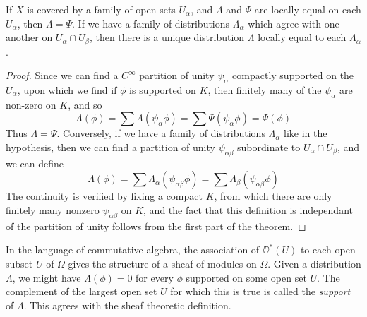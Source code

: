 \begin{theorem}
    If $X$ is covered by a family of open sets $U_\alpha$, and $\Lambda$ and $\Psi$ are locally equal on each $U_\alpha$, then $\Lambda = \Psi$. If we have a family of distributions $\Lambda_\alpha$ which agree with one another on $U_\alpha \cap U_\beta$, then there is a unique distribution $\Lambda$ locally equal to each $\Lambda_\alpha$.
\end{theorem}
\begin{proof}
    Since we can find a $C^\infty$ partition of unity $\psi_\alpha$ compactly supported on the $U_\alpha$, upon which we find if $\phi$ is supported on $K$, then finitely many of the $\psi_\alpha$ are non-zero on $K$, and so
    \[ \Lambda(\phi) = \sum \Lambda(\psi_\alpha \phi) = \sum \Psi(\psi_\alpha \phi) = \Psi(\phi) \]
    Thus $\Lambda = \Psi$. Conversely, if we have a family of distributions $\Lambda_\alpha$ like in the hypothesis, then we can find a partition of unity $\psi_{\alpha \beta}$ subordinate to $U_\alpha \cap U_\beta$, and we can define
    \[ \Lambda(\phi) = \sum \Lambda_\alpha(\psi_{\alpha \beta} \phi) = \sum \Lambda_\beta(\psi_{\alpha \beta} \phi) \]
    The continuity is verified by fixing a compact $K$, from which there are only finitely many nonzero $\psi_{\alpha \beta}$ on $K$, and the fact that this definition is independant of the partition of unity follows from the first part of the theorem.
\end{proof}

In the language of commutative algebra, the association of $\DD^*(U)$ to each open subset $U$ of $\Omega$ gives the structure of a sheaf of modules on $\Omega$. Given a distribution $\Lambda$, we might have $\Lambda(\phi) = 0$ for every $\phi$ supported on some open set $U$. The complement of the largest open set $U$ for which this is true is called the \emph{support} of $\Lambda$. This agrees with the sheaf theoretic definition.


